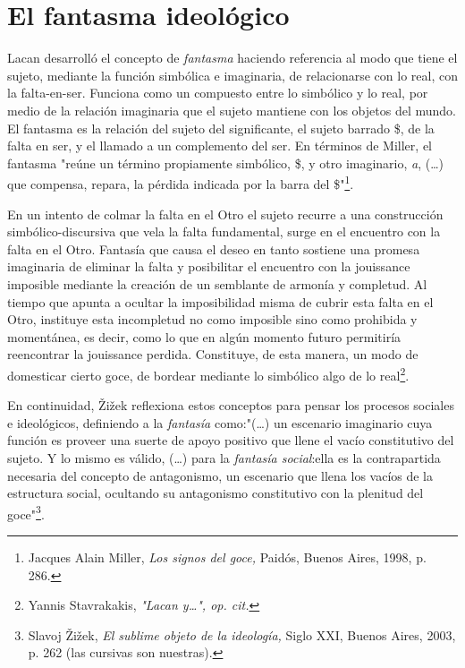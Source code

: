 \documentclass{book}
\begin{document}
\section{El fantasma ideológico}

Lacan desarrolló el concepto de \emph{fantasma} haciendo referencia al
modo que tiene el sujeto, mediante la función simbólica e imaginaria, de
relacionarse con lo real, con la falta-en-ser. Funciona como un
compuesto entre lo simbólico y lo real, por medio de la relación
imaginaria que el sujeto mantiene con los objetos del mundo. El fantasma
es la relación del sujeto del significante, el sujeto barrado \$, de la
falta en ser, y el llamado a un complemento del ser. En términos de
Miller, el fantasma "reúne un término propiamente simbólico, \$, y otro
imaginario, \emph{a}, (\dots) que compensa, repara, la pérdida
indicada por la barra del \$"\footnote{Jacques Alain Miller, \emph{Los
  signos del goce,} Paidós, Buenos Aires, 1998, p. 286.}.

En un intento de colmar la falta en el Otro el sujeto recurre a una
construcción simbólico-discursiva que vela la falta fundamental, surge
en el encuentro con la falta en el Otro. Fantasía que causa el deseo en
tanto sostiene una promesa imaginaria de eliminar la falta y posibilitar
el encuentro con la jouissance imposible mediante la creación de un
semblante de armonía y completud. Al tiempo que apunta a ocultar la
imposibilidad misma de cubrir esta falta en el Otro, instituye esta
incompletud no como imposible sino como prohibida y momentánea, es
decir, como lo que en algún momento futuro permitiría reencontrar la
jouissance perdida. Constituye, de esta manera, un modo de domesticar
cierto goce, de bordear mediante lo simbólico algo de lo
real\footnote{Yannis Stavrakakis, \emph{"Lacan y\ldots", op. cit.}}.

En continuidad, Žižek reflexiona estos conceptos para pensar los
procesos sociales e ideológicos, definiendo a la \emph{fantasía}
como:"(\dots) un escenario imaginario cuya función es proveer una
suerte de apoyo positivo que llene el vacío constitutivo del sujeto. Y
lo mismo es válido, (\dots) para la \emph{fantasía social}:ella es
la contrapartida necesaria del concepto de antagonismo, un escenario que
llena los vacíos de la estructura social, ocultando su antagonismo
constitutivo con la plenitud del goce"\footnote{Slavoj Žižek, \emph{El
  sublime objeto de la ideología,} Siglo XXI, Buenos Aires, 2003, p. 262
  (las cursivas son nuestras).}.
\end{document}
